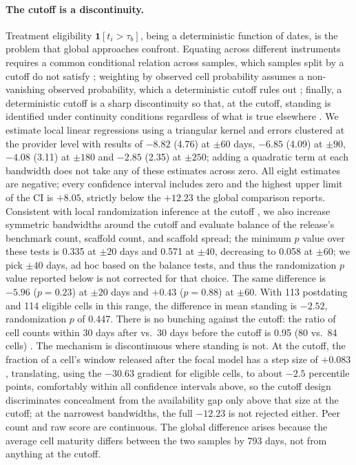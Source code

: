 \documentclass{article}
\begin{document}
\paragraph{The cutoff is a discontinuity.}
Treatment eligibility $\mathbf{1}[t_i > \tau_b]$, being a deterministic function of dates, is the problem that global approaches confront. Equating across different instruments requires a common conditional relation across samples, which samples split by a cutoff do not satisfy \citep{sinharay2010missing}; weighting by observed cell probability assumes a non-vanishing observed probability, which a deterministic cutoff rules out \citep{ma2019missing}; finally, a deterministic cutoff is a sharp discontinuity so that, at the cutoff, standing is identified under continuity conditions regardless of what is true elsewhere \citep{hahn2001identification}. We estimate local linear regressions using a triangular kernel and errors clustered at the provider level with results of $-8.82$ (4.76) at $\pm 60$ days, $-6.85$ (4.09) at $\pm 90$, $-4.08$ (3.11) at $\pm 180$ and $-2.85$ (2.35) at $\pm 250$; adding a quadratic term at each bandwidth does not take any of these estimates across zero. All eight estimates are negative; every confidence interval includes zero and the highest upper limit of the CI is $+8.05$, strictly below the $+12.23$ the global comparison reports. Consistent with local randomization inference at the cutoff \citep{cattaneo2015randomization}, we also increase symmetric bandwidths around the cutoff and evaluate balance of the release's benchmark count, scaffold count, and scaffold spread; the minimum $p$ value over these tests is 0.335 at $\pm 20$ days and 0.571 at $\pm 40$, decreasing to 0.058 at $\pm 60$; we pick $\pm 40$ days, ad hoc based on the balance tests, and thus the randomization $p$ value reported below is not corrected for that choice. The same difference is $-5.96$ ($p = 0.23$) at $\pm 20$ days and $+0.43$ ($p = 0.88$) at $\pm 60$. With 113 postdating and 114 eligible cells in this range, the difference in mean standing is $-2.52$, randomization $p$ of 0.447. There is no bunching against the cutoff: the ratio of cell counts within 30 days after vs.\ 30 days before the cutoff is 0.95 (80 vs.\ 84 cells) \citep{mccrary2008manipulation}. The mechanism is discontinuous where standing is not. At the cutoff, the fraction of a cell's window released after the focal model has a step size of $+0.083$, translating, using the $-30.63$ gradient for eligible cells, to about $-2.5$ percentile points, comfortably within all confidence intervals above, so the cutoff design discriminates concealment from the availability gap only above that size at the cutoff; at the narrowest bandwidths, the full $-12.23$ is not rejected either. Peer count and raw score are continuous. The global difference arises because the average cell maturity differs between the two samples by 793 days, not from anything at the cutoff.
\end{document}
